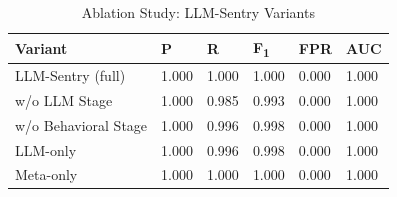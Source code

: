 \begin{table}[t]
\centering
\caption{Ablation Study: LLM-Sentry Variants}
\label{tab:ablation}
\small
\begin{tabular}{llllll}
\toprule
\textbf{Variant} & \textbf{P} & \textbf{R} & \textbf{F\textsubscript{1}} & \textbf{FPR} & \textbf{AUC} \\
\midrule
LLM-Sentry (full) & 1.000 & 1.000 & 1.000 & 0.000 & 1.000 \\
w/o LLM Stage & 1.000 & 0.985 & 0.993 & 0.000 & 1.000 \\
w/o Behavioral Stage & 1.000 & 0.996 & 0.998 & 0.000 & 1.000 \\
LLM-only & 1.000 & 0.996 & 0.998 & 0.000 & 1.000 \\
Meta-only & 1.000 & 1.000 & 1.000 & 0.000 & 1.000 \\
\bottomrule
\end{tabular}
\end{table}